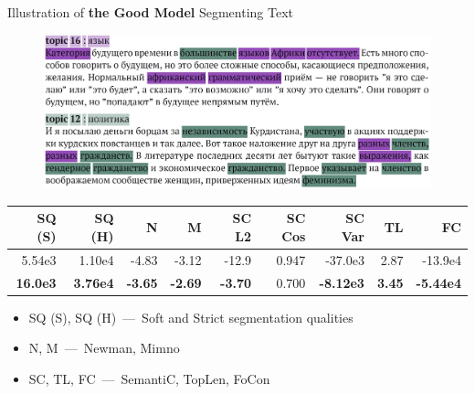 \documentclass[russian]{beamer}
\begin{document}
\begin{frame}{Illustration of \textbf{the Good Model} Segmenting Text}
  \begin{figure}[h]
    \centering
    \includegraphics[width=\textwidth]{combine_good.jpg}
  \end{figure}
    
  \vspace{-0.5cm}

  \begin{table}[h]
    \scriptsize
    \centering
    \begin{tabular}{rrrrrrrrr}
      SQ (S) & SQ (H) & N & M & SC L2 & SC Cos & SC Var & TL & FC\\
      \midrule
      5.54e3 & 1.10e4 & -4.83 & -3.12 & -12.9 & 0.947 & -37.0e3 & 2.87 & -13.9e4\\
      \rowcolor{my-blue-light}
      \textbf{16.0e3} & \textbf{3.76e4} & \textbf{-3.65} & \textbf{-2.69} & \textbf{-3.70} & 0.700 & \textbf{-8.12e3} & \textbf{3.45} & \textbf{-5.44e4}
    \end{tabular}
  \end{table}
  
  \begin{itemize}\setlength{\itemindent}{0pt}
    \small
    \item SQ (S), SQ (H)~---~Soft and Strict segmentation qualities
    \item N, M~---~Newman, Mimno
    \item SC, TL, FC~---~SemantiC, TopLen, FoCon
  \end{itemize}
\end{frame}
\end{document}
